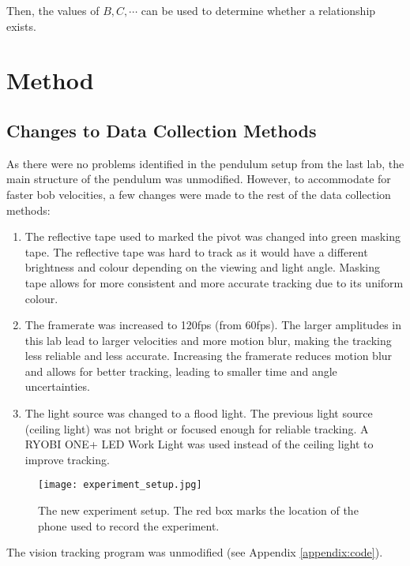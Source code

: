 \documentclass[aps,twocolumn,secnumarabic,nobalancelastpage,amsmath,amssymb,nofootinbib,floatfix,letterpaper]{revtex4}
\begin{document}
Then, the values of $B, C, \cdots$ can be used to determine whether a relationship exists.


\section{Method}

\subsection{Changes to Data Collection Methods}

As there were no problems identified in the pendulum setup from the last lab, the main structure of the pendulum was
unmodified. However, to accommodate for faster bob velocities, a few changes were made to the rest of the data
collection methods:

\begin{enumerate}
    \item The reflective tape used to marked the pivot was changed into green masking tape. The reflective tape was
          hard to track as it would have a different brightness and colour depending on the viewing and light angle.
          Masking tape allows for more consistent and more accurate tracking due to its uniform colour.
    \item The framerate was increased to 120fps (from 60fps). The larger amplitudes in this lab lead to larger
          velocities and more motion blur, making the tracking less reliable and less accurate. Increasing the framerate
          reduces motion blur and allows for better tracking, leading to smaller time and angle uncertainties.
    \item The light source was changed to a flood light. The previous light source (ceiling light) was not bright or
          focused enough for reliable tracking. A RYOBI ONE+ LED Work Light was used instead of the ceiling light to
          improve tracking.
\end{enumerate}

\begin{figure}[htb]
    \texttt{[image: experiment\_setup.jpg]}
    \caption{The new experiment setup. The red box marks the location of the phone used to record the experiment.}
\end{figure}

The vision tracking program was unmodified (see Appendix \ref{appendix:code}).
\end{document}
